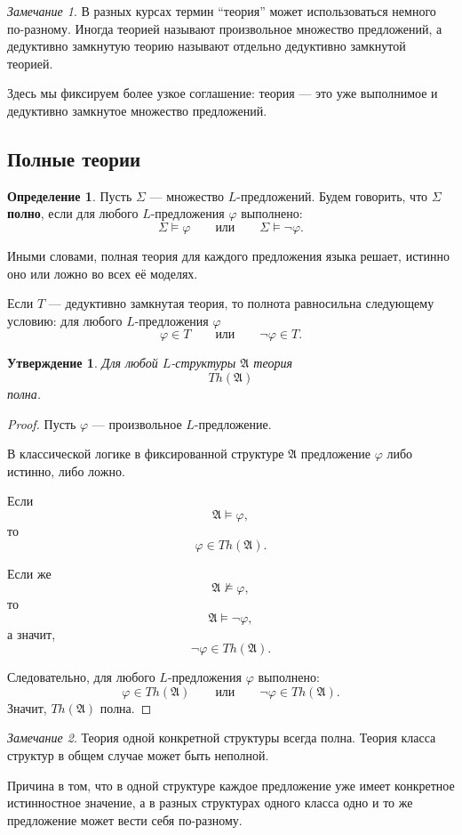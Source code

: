 \documentclass[12pt,a4paper,oneside,openany]{book}
\theoremstyle{definition}
\newtheorem{definition}{Определение}[chapter]
\theoremstyle{plain}
\newtheorem{proposition}{Утверждение}[chapter]
\theoremstyle{remark}
\newtheorem{remark}{Замечание}[chapter]
\begin{document}
\begin{remark}
В разных курсах термин ``теория'' может использоваться немного по-разному. Иногда теорией называют произвольное множество предложений, а дедуктивно замкнутую теорию называют отдельно дедуктивно замкнутой теорией.

Здесь мы фиксируем более узкое соглашение: теория — это уже выполнимое и дедуктивно замкнутое множество предложений.
\end{remark}

\subsection{Полные теории}

\begin{definition}
Пусть $\Sigma$ — множество $L$-предложений. Будем говорить, что $\Sigma$ \textbf{полно}, если для любого $L$-предложения $\varphi$ выполнено:
\[
\Sigma\models\varphi
\qquad
\text{или}
\qquad
\Sigma\models\neg\varphi.
\]
\end{definition}

Иными словами, полная теория для каждого предложения языка решает, истинно оно или ложно во всех её моделях.

Если $T$ — дедуктивно замкнутая теория, то полнота равносильна следующему условию:
для любого $L$-предложения $\varphi$
\[
\varphi\in T
\qquad
\text{или}
\qquad
\neg\varphi\in T.
\]

\begin{proposition}
Для любой $L$-структуры $\mathfrak A$ теория
\[
Th(\mathfrak A)
\]
полна.
\end{proposition}

\begin{proof}
Пусть $\varphi$ — произвольное $L$-предложение.

В классической логике в фиксированной структуре $\mathfrak A$ предложение $\varphi$ либо истинно, либо ложно.

Если
\[
\mathfrak A\models\varphi,
\]
то
\[
\varphi\in Th(\mathfrak A).
\]

Если же
\[
\mathfrak A\not\models\varphi,
\]
то
\[
\mathfrak A\models\neg\varphi,
\]
а значит,
\[
\neg\varphi\in Th(\mathfrak A).
\]

Следовательно, для любого $L$-предложения $\varphi$ выполнено:
\[
\varphi\in Th(\mathfrak A)
\qquad
\text{или}
\qquad
\neg\varphi\in Th(\mathfrak A).
\]
Значит, $Th(\mathfrak A)$ полна.
\end{proof}

\begin{remark}
Теория одной конкретной структуры всегда полна. Теория класса структур в общем случае может быть неполной.

Причина в том, что в одной структуре каждое предложение уже имеет конкретное истинностное значение, а в разных структурах одного класса одно и то же предложение может вести себя по-разному.
\end{remark}
\end{document}
